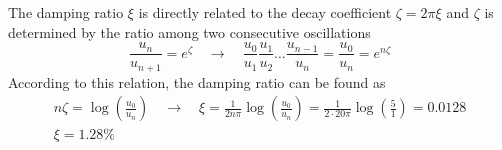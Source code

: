 \documentclass{problems}
\begin{document}



The damping ratio $\xi$ is directly related to the decay coefficient
$\zeta=2\pi\xi$ and $\zeta$ is determined by the ratio among two consecutive oscillations
$$
\frac{u_n}{u_{n+1}} = e^\zeta \quad \rightarrow \quad
\frac{u_0}{u_1} \frac{u_1}{u_2} \dots \frac{u_{n-1}}{u_n} = \frac{u_0}{u_n} = e^{n\zeta}
$$
According to this relation, the damping ratio can be found as
\begin{align*}
n\zeta = \log\left(\frac{u_0}{u_n}\right) \quad \rightarrow \quad
\xi = \frac{1}{2n\pi} \log\left(\frac{u_0}{u_n}\right) = \frac{1}{2\cdot20\pi} \log\left(\frac{5}{1}\right) = 0.0128 \\
\xi = 1.28\%
\end{align*}
\end{document}
